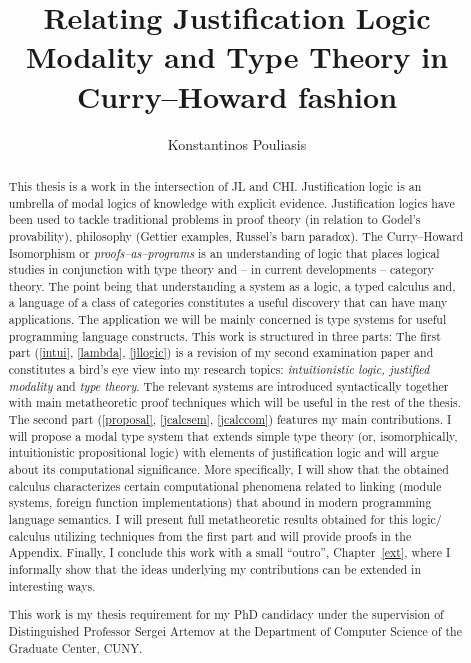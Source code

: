 \documentclass[12pt]{report}
\title{Relating Justification Logic Modality and Type Theory in Curry--Howard fashion}
\author{Konstantinos Pouliasis}
\begin{document}
\maketitle


\begin{abstract}
This thesis is a work in the intersection of \ac{JL} and \ac{CHI}. Justification logic is an umbrella of modal logics of knowledge with explicit evidence. 
Justification logics have been used to tackle traditional problems in proof theory (in relation to Godel's provability), philosophy (Gettier examples, Russel's barn paradox). 
The Curry--Howard Isomorphism or \emph{proofs--as--programs} is an understanding of logic that places logical studies in conjunction with type theory and -- in current developments -- 
category theory. The point being that  understanding a system as a logic, a typed calculus and,  a language of a class of categories constitutes a useful discovery 
that can have many applications.
The application  we will be mainly concerned  is type systems for useful programming language constructs. 
This work  is structured in three parts: 
The first part (\cref{intui}, \cref{lambda}, \cref{jllogic}) is a revision of my second examination paper and constitutes 
a bird's eye view into my 
research topics:  
\emph{intuitionistic logic, justified modality} and \emph{type theory}. 
The relevant systems are introduced syntactically together with main 
 metatheoretic proof techniques which will be useful 
in the rest of the thesis.
The second part (\cref{proposal}, \cref{jcalcsem}, \cref{jcalccom}) 
features my main contributions.
I will propose  
a modal type system that extends simple type theory
 (or, isomorphically, intuitionistic propositional logic) with elements of
 justification logic and will argue about its computational significance. 
 More specifically, I will show  
that the obtained calculus characterizes  certain 
computational phenomena related to linking (module systems, foreign function implementations) 
that abound in modern programming language semantics. 
I will present full metatheoretic
results obtained for this logic/ calculus utilizing techniques from the first part 
and will provide proofs in the Appendix. 
Finally, I conclude this work with a small ``outro'', Chapter~\ref{ext},
where I informally show that the ideas underlying my contributions 
can be extended in interesting ways.

This work is my thesis requirement for my PhD candidacy under the supervision of Distinguished Professor Sergei Artemov at the Department of 
Computer Science of the Graduate Center, CUNY.
\end{abstract}

\tableofcontents








\begin{appendices}

\end{appendices}




\nocite{Pfenning2009a, Pfenning2009b}




\end{document}
